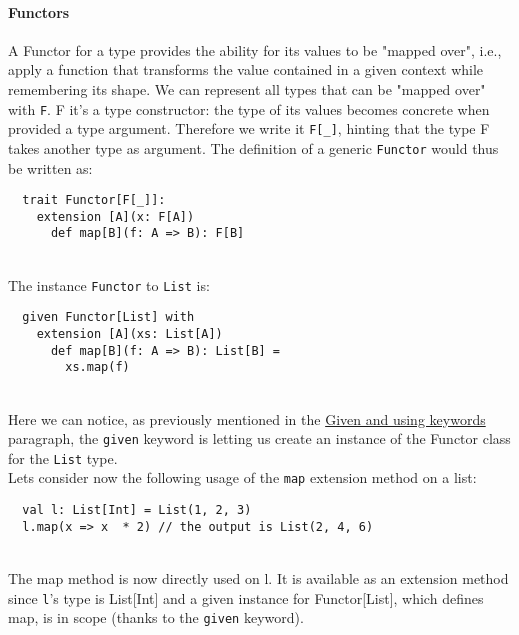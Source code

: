 \paragraph{Functors}
A Functor for a type provides the ability for its values to be "mapped over", i.e., apply a function that transforms the value contained in a given context while remembering its shape.
We can represent all types that can be "mapped over" with \texttt{F}.
F it's a type constructor: the type of its values becomes concrete when provided a type argument.
Therefore we write it \texttt{F[\_]}, hinting that the type F takes another type as argument.
The definition of a generic \texttt{Functor} would thus be written as:
\begin{verbatim}
  trait Functor[F[_]]:
    extension [A](x: F[A])
      def map[B](f: A => B): F[B]
\end{verbatim}\mbox{}\\
The instance \texttt{Functor} to \texttt{List} is:
\begin{verbatim}
  given Functor[List] with
    extension [A](xs: List[A])
      def map[B](f: A => B): List[B] =
        xs.map(f)
\end{verbatim}\mbox{}\\
Here we can notice, as previously mentioned in the \hyperref[par:given-using]{Given and using keywords} paragraph, the \texttt{given} keyword is letting us create an instance of the Functor class for the \texttt{List} type.\\
Lets consider now the following usage of the \texttt{map} extension method on a list:
\begin{verbatim}
  val l: List[Int] = List(1, 2, 3)
  l.map(x => x  * 2) // the output is List(2, 4, 6)
\end{verbatim}\mbox{}\\
The map method is now directly used on l. It is available as an extension method since \texttt{l}'s type is List[Int] and a given instance for Functor[List], which defines map, is in scope (thanks to the \texttt{given} keyword).


